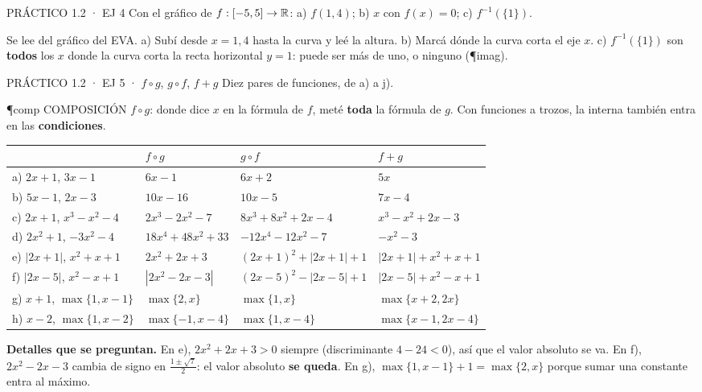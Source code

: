 \begin{enunciado}{PRÁCTICO 1.2 · EJ 4}
Con el gráfico de $f:[-5,5]\to\mathbb{R}$: a) $f(1{,}4)$; b) $x$ con $f(x)=0$; c) $f^{-1}(\{1\})$.
\end{enunciado}
\begin{falta}
Se lee del gráfico del EVA. a) Subí desde $x=1{,}4$ hasta la curva y leé la altura. b) Marcá dónde la curva corta el eje $x$. c) $f^{-1}(\{1\})$ son \textbf{todos} los $x$ donde la curva corta la recta horizontal $y=1$: puede ser más de uno, o ninguno (\P{imag}).
\end{falta}

\begin{enunciado}{PRÁCTICO 1.2 · EJ 5 · $f\circ g$, $g\circ f$, $f+g$}
Diez pares de funciones, de a) a j).
\end{enunciado}
\begin{uso}{\P{comp} COMPOSICIÓN}
$f\circ g$: donde dice $x$ en la fórmula de $f$, meté \textbf{toda} la fórmula de $g$. Con funciones a trozos, la interna también entra en las \textbf{condiciones}.
\end{uso}
\begin{center}\small
\renewcommand{\arraystretch}{1.25}
\begin{tabularx}{\linewidth}{@{}l X X X@{}}\toprule
& $f\circ g$ & $g\circ f$ & $f+g$\\\midrule
a) $2x+1$, $3x-1$ & $6x-1$ & $6x+2$ & $5x$\\
b) $5x-1$, $2x-3$ & $10x-16$ & $10x-5$ & $7x-4$\\
c) $2x+1$, $x^3-x^2-4$ & $2x^3-2x^2-7$ & $8x^3+8x^2+2x-4$ & $x^3-x^2+2x-3$\\
d) $2x^2+1$, $-3x^2-4$ & $18x^4+48x^2+33$ & $-12x^4-12x^2-7$ & $-x^2-3$\\
e) $|2x+1|$, $x^2+x+1$ & $2x^2+2x+3$ & $(2x+1)^2+|2x+1|+1$ & $|2x+1|+x^2+x+1$\\
f) $|2x-5|$, $x^2-x+1$ & $|2x^2-2x-3|$ & $(2x-5)^2-|2x-5|+1$ & $|2x-5|+x^2-x+1$\\
g) $x+1$, $\max\{1,x-1\}$ & $\max\{2,x\}$ & $\max\{1,x\}$ & $\max\{x+2,2x\}$\\
h) $x-2$, $\max\{1,x-2\}$ & $\max\{-1,x-4\}$ & $\max\{1,x-4\}$ & $\max\{x-1,2x-4\}$\\\bottomrule
\end{tabularx}
\end{center}
\textbf{Detalles que se preguntan.} En e), $2x^2+2x+3>0$ siempre (discriminante $4-24<0$), así que el valor absoluto se va. En f), $2x^2-2x-3$ cambia de signo en $\frac{1\pm\sqrt7}2$: el valor absoluto \textbf{se queda}. En g), $\max\{1,x-1\}+1=\max\{2,x\}$ porque sumar una constante entra al máximo.
